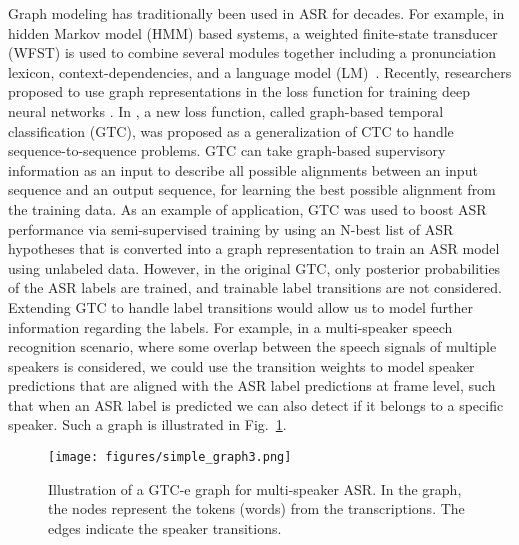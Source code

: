 \documentclass{article}
\begin{document}
Graph modeling has traditionally been used in ASR for decades.
For example, in 
hidden Markov model (HMM) based systems, a weighted finite-state transducer (WFST) is used to combine several modules together including a pronunciation lexicon, context-dependencies, and a language model (LM)~\cite{mohri2002weighted,hori2007efficient}. Recently, researchers proposed to use graph representations in the loss function for training deep neural networks \cite{hannun2020differentiable}. In \cite{moritz2021semi}, a new loss function, called graph-based temporal classification (GTC), was proposed as a generalization of CTC to handle sequence-to-sequence problems. GTC can take 
graph-based supervisory information 
as an input 
to describe all possible alignments between an input sequence and an output sequence, for learning the best possible alignment from the training data.
As an example of application, GTC was used to boost ASR performance via semi-supervised training \cite{Lamel2002lightlySupASR,Huang2013SemisupervisedGA} by using an N-best list of ASR hypotheses that is converted into a graph representation to train an ASR model using unlabeled data. 
However, in the original GTC, only posterior probabilities of the ASR labels are trained, and trainable label transitions are not considered. Extending GTC to handle label transitions would allow us to model further information regarding the labels.  For example, in a multi-speaker speech recognition scenario, where some overlap between the speech signals of multiple speakers is considered, we could use the transition weights to model speaker predictions that are aligned with the ASR label predictions at frame level, such that when an ASR label is predicted we can also detect if it belongs to a specific speaker.
Such a graph is illustrated in Fig.~\ref{fig:wfst}.

\begin{figure}
    \vspace{-12pt}
    \centering
    \texttt{[image: figures/simple\_graph3.png]}
    \caption{Illustration of a GTC-e graph for multi-speaker ASR. In the graph, the nodes represent the tokens (words) from the transcriptions. The edges indicate the speaker transitions.}
    \label{fig:wfst}
    \vspace{-12pt}
\end{figure}
\end{document}
